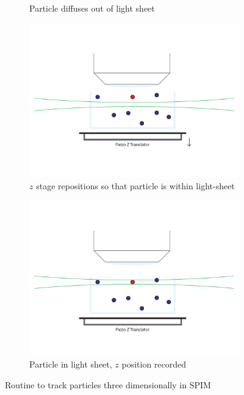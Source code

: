 \begin{figure}
\begin{subfigure}[b]{0.35\linewidth}
		\caption{Particle diffuses out of light sheet}
		\label{fig:SPIMSPT2}
	\end{subfigure}
	\begin{subfigure}[b]{0.35\linewidth}
		\centering
		\includegraphics[width=\linewidth]{tracking/3_piezo_track}
		\caption{\(z\) stage repositions so that particle is within light-sheet}
		\label{fig:SPIMSPT3}
	\end{subfigure}
	\begin{subfigure}[b]{0.35\linewidth}
		\centering
		\includegraphics[width=\linewidth]{tracking/4_piezo_track}
		\caption{Particle in light sheet, \(z\) position recorded}
		\label{fig:SPIMSPT4}
	\end{subfigure}
	\caption{Routine to track particles three dimensionally in SPIM}
	\label{fig:SPIMSPT}
\end{figure}

